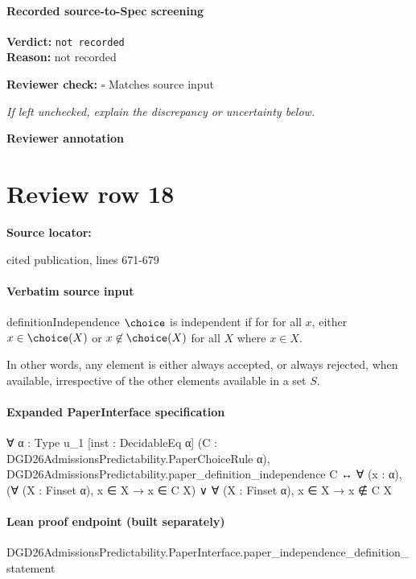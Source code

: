 \documentclass[10pt]{article}
\newcommand{\reviewerbox}{%
  \par\noindent\fbox{\parbox{0.96\linewidth}{\rule{0pt}{0.38in}}}\par
}
\newcommand{\reviewmatch}[1]{%
  \par\noindent\textbf{Reviewer check:} $\square$\; #1\par
  \noindent\emph{If left unchecked, explain the discrepancy or uncertainty below.}\par
}
\begin{document}
\paragraph{Recorded source-to-Spec screening}
\textbf{Verdict:} \texttt{not recorded}
\\
\textbf{Reason:} not recorded
\reviewmatch{Matches source input}
\noindent\textbf{Reviewer annotation}\par
\reviewerbox
\clearpage
\hypertarget{source-claim-e633cfedc7bfb493}{}
\section*{Review row 18}
\textbf{Source locator:} {\footnotesize\raggedright cited publication, lines 671-\allowbreak{}679\par}
\paragraph{Verbatim source input}
\begin{ReviewVerbatim}
\begin{restatable}{definition}{Independence}
\label{def:independence}
$\choice$ is independent if for
 for all $x$,
either $x \in \choice(X)$
or $x \not\in \choice(X)$ for all $X$ where $x \in X$.
\end{restatable}

In other words, any element is either always accepted, or always rejected, when available, irrespective of the other elements available in a set $S$.
\end{ReviewVerbatim}


\paragraph{Expanded PaperInterface specification}
\begin{ReviewVerbatim}
∀ {α : Type u_1} [inst : DecidableEq α] (C : DGD26AdmissionsPredictability.PaperChoiceRule α),
  DGD26AdmissionsPredictability.paper_definition_independence C ↔
    ∀ (x : α), (∀ (X : Finset α), x ∈ X → x ∈ C X) ∨ ∀ (X : Finset α), x ∈ X → x ∉ C X
\end{ReviewVerbatim}

\paragraph{Lean proof endpoint (built separately)}\begin{ReviewVerbatim}
DGD26AdmissionsPredictability.PaperInterface.paper_independence_definition_statement
\end{ReviewVerbatim}
\end{document}
